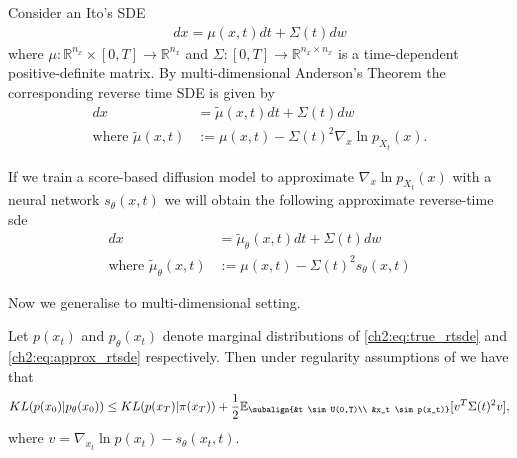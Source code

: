 Consider an Ito's SDE
\begin{align*}
    dx = \mu(x, t)dt + \Sigma(t)dw
\end{align*}
where $\mu: \mathbb{R}^{n_x} \times [0,T] \xrightarrow{} \mathbb{R}^{n_x}$ and $\Sigma: [0,T] \xrightarrow{} \mathbb{R}^{n_x \times n_x}$ is a time-dependent positive-definite matrix. By multi-dimensional Anderson's Theorem \cite{anderson1982reverse_time_sde} the corresponding reverse time SDE is given by 
\begin{align}
    \label{ch2:eq:true_rtsde}
    dx &= \tilde{\mu}(x, t)dt + \Sigma(t)dw \\
    \text{where } \tilde{\mu}(x,t) &:= \mu(x,t) -  \Sigma(t)^2 \nabla_x \ln p_{X_t}(x). \nonumber
\end{align}

If we train a score-based diffusion model to approximate $\nabla_x \ln p_{X_t}(x)$ with a neural network $s_\theta(x,t)$ we will obtain the following approximate reverse-time sde
\begin{align}
    \label{ch2:eq:approx_rtsde}
    dx &= \tilde{\mu}_\theta(x, t)dt + \Sigma(t)dw \\
    \text{where } \tilde{\mu}_\theta(x,t) &:= \mu(x,t) -  \Sigma(t)^2 s_\theta(x,t) \nonumber
\end{align} 


Now we generalise \cite[Theorem 1]{song2021maximum} to multi-dimensional setting.
\begin{theorem} 
    Let $p(x_t)$ and $p_\theta(x_t)$ denote marginal distributions of \ref{ch2:eq:true_rtsde} and \ref{ch2:eq:approx_rtsde} respectively. Then under regularity assumptions of \cite[Theorem 1]{song2021maximum} we have that 
    \label{ch2:thm:multi-dim}
    \begin{equation}
        KL(p(x_0) | p_\theta(x_0)) \leq KL(p(x_T) | \pi(x_T)) + \frac{1}{2} \mathbb{E}_{\subalign{&t \sim U(0,T)\\ &x_t \sim p(x_t)}} [v^T \Sigma(t)^2 v],
    \end{equation}
    where $v=\nabla_{x_t} \ln{p(x_t)} - s_\theta(x_t,t)$. 
\end{theorem}

